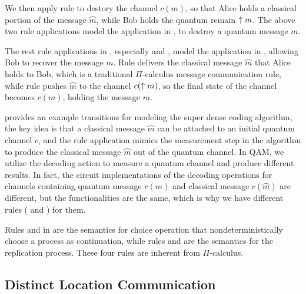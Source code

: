 We then apply rule  to destory the channel $c(m)$, so that Alice holds a classical portion of the message $\wideparen{m}$, while Bob holds the quantum remain $\uparrow m$. The above two rule applications model the  application in , to destroy a quantum message $m$.

The rest rule applications in , especially  and , model the  application in  , allowing Bob to recover the message $m$.
Rule  delivers the classical message $\wideparen{m}$ that Alice holds to Bob, which is a traditional $\Pi$-calculus message communication rule, while rule  pushes $\wideparen{m}$ to the channel $c(\uparrow m)$, so the final state of the channel becomes $c(m)$, holding the message $m$.

 provides an example transitions for modeling the super dense coding algorithm,
the key idea is that a classical message $\wideparen{m}$ can be attached to an initial quantum channel $c$, and the rule  application mimics the measurement step in the algorithm to produce the classical message $\wideparen{m}$ out of the quantum channel.
In QAM, we utilize the decoding action to measure a quantum channel and produce different results.
In fact, the circuit implementations of the decoding operations for channels containing quantum message $c(m)$ and classical message $c(\wideparen{m})$ are different, but the functionalities are the same, which is why we have different rules ( and ) for them.

Rules  and  in  are the semantics for choice operation that nondeterministically choose a process as continuation, while rules  and  are the semantics for the replication process.
These four rules are inherent from $\Pi$-calculus.

\subsection{Distinct Location Communication} \label{sec:qamsyntax1}

